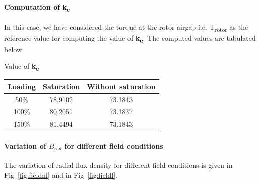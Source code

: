 \documentclass[a4paper,11pt]{article}
\begin{document}
\paragraph*{Computation of k\textsubscript{e}}
In this case, we have considered the torque at the rotor airgap i.e. T\textsubscript{rotor} as the reference value for computing the value of \textbf{k\textsubscript{e}}. The computed values are tabulated below
\begin{center}
  Value of \textbf{k\textsubscript{e}}
  
  \begin{tabular}{|c|c|c|}
    \hline
    Loading & Saturation & Without saturation \\ \hline
    50\% & 78.9102 & 73.1843 \\ \hline
    100\% & 80.2051 & 73.1837 \\ \hline
    150\% & 81.4494 & 73.1843 \\ \hline
  \end{tabular}
\end{center}

\paragraph*{Variation of $B_{rad}$ for different field conditions}
The variation of radial flux density for different field conditions is given in Fig~\ref{fig:fieldnl} and in Fig~\ref{fig:fieldl}.
\end{document}
